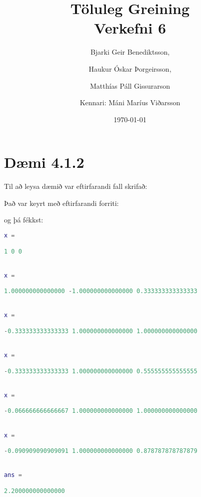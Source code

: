 \documentclass[a4]{article}
\title{Töluleg Greining\\ Verkefni 6}
\date{\today{}}
\author{ 
  Bjarki Geir Benediktsson,\and
  Haukur Óskar Þorgeirsson,\and
  Matthías Páll Gissurarson \and
  Kennari: Máni Maríus Viðarsson
  }
\begin{document}
\maketitle
\section{Dæmi 4.1.2}
Til að leysa dæmið var eftirfarandi fall skrifað:


Það var keyrt með eftirfarandi forriti:


og þá fékkst:

\begin{lstlisting}[language=Matlab]
x =

1 0 0


x =

1.000000000000000 -1.000000000000000 0.333333333333333


x =

-0.333333333333333 1.000000000000000 1.000000000000000


x =

-0.333333333333333 1.000000000000000 0.555555555555555


x =

-0.066666666666667 1.000000000000000 1.000000000000000


x =

-0.090909090909091 1.000000000000000 0.878787878787879


ans =

2.200000000000000
\end{lstlisting}
\end{document}
